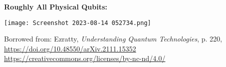 \huge\begin{center} \textbf{Roughly All Physical Qubits:}
\end{center}


\begin{center}

\texttt{[image: Screenshot 2023-08-14 052734.png]}

\end{center}


\large\begin{center}

Borrowed from: Ezratty, \textit{Understanding Quantum Technologies}, p. 220, \url{https://doi.org/10.48550/arXiv.2111.15352}
\url{https://creativecommons.org/licenses/by-nc-nd/4.0/}

\large\end{center}